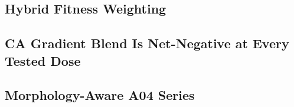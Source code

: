 \documentclass[letterpaper]{article} %
\begin{document}
\subsection{Hybrid Fitness Weighting}

\subsection{CA Gradient Blend Is Net-Negative at Every Tested Dose}

\subsection{Morphology-Aware A04 Series}
\end{document}
